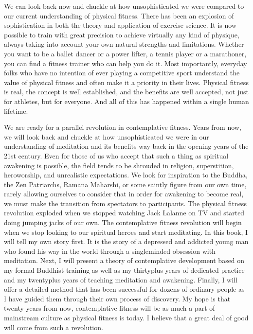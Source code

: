 \documentclass[a5paper,10pt,english]{book}
\begin{document}
\sphinxAtStartPar
We can look back now and chuckle at how unsophisticated we were compared
to our current understanding of physical fitness. There has been an
explosion of sophistication in both the theory and application of
exercise science. It is now possible to train with great precision to
achieve virtually any kind of physique, always taking into account your
own natural strengths and limitations. Whether you want to be a ballet
dancer or a power lifter, a tennis player or a marathoner, you can find
a fitness trainer who can help you do it. Most importantly, everyday
folks who have no intention of ever playing a competitive sport
understand the value of physical fitness and often make it a priority in
their lives. Physical fitness is real, the concept is well established,
and the benefits are well accepted, not just for athletes, but for
everyone. And all of this has happened within a single human lifetime.

\sphinxAtStartPar
We are ready for a parallel revolution in contemplative fitness. Years
from now, we will look back and chuckle at how unsophisticated we were
in our understanding of meditation and its benefits way back in the
opening years of the 21st century. Even for those of us who accept that
such a thing as spiritual awakening is possible, the field tends to be
shrouded in religion, superstition, hero\sphinxhyphen{}worship, and unrealistic
expectations. We look for inspiration to the Buddha, the Zen Patriarchs,
Ramana Maharshi, or some saintly figure from our own time, rarely
allowing ourselves to consider that in order for awakening to become
real, we must make the transition from spectators to participants. The
physical fitness revolution exploded when we stopped watching Jack
Lalanne on TV and started doing jumping jacks of our own. The
contemplative fitness revolution will begin when we stop looking to our
spiritual heroes and start meditating. In this book, I will tell my own
story first. It is the story of a depressed and addicted young man who
found his way in the world through a single\sphinxhyphen{}minded obsession with
meditation. Next, I will present a theory of contemplative development
based on my formal Buddhist training as well as my thirty\sphinxhyphen{}plus years of
dedicated practice and my twenty\sphinxhyphen{}plus years of teaching meditation and
awakening. Finally, I will offer a detailed method that has been
successful for dozens of ordinary people as I have guided them through
their own process of discovery. My hope is that twenty years from now,
contemplative fitness will be as much a part of mainstream culture as
physical fitness is today. I believe that a great deal of good will come
from such a revolution.
\end{document}
